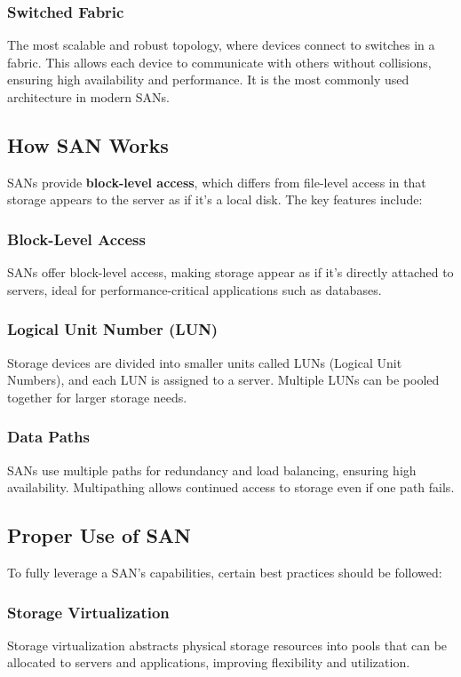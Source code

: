 \documentclass{article}
\begin{document}
\subsubsection{Switched Fabric}
The most scalable and robust topology, where devices connect to switches in a fabric. This allows each device to communicate with others without collisions, ensuring high availability and performance. It is the most commonly used architecture in modern SANs.

\subsection{How SAN Works}
SANs provide \textbf{block-level access}, which differs from file-level access in that storage appears to the server as if it's a local disk. The key features include:

\subsubsection{Block-Level Access}
SANs offer block-level access, making storage appear as if it's directly attached to servers, ideal for performance-critical applications such as databases.

\subsubsection{Logical Unit Number (LUN)}
Storage devices are divided into smaller units called LUNs (Logical Unit Numbers), and each LUN is assigned to a server. Multiple LUNs can be pooled together for larger storage needs.

\subsubsection{Data Paths}
SANs use multiple paths for redundancy and load balancing, ensuring high availability. Multipathing allows continued access to storage even if one path fails.

\subsection{Proper Use of SAN}
To fully leverage a SAN's capabilities, certain best practices should be followed:

\subsubsection{Storage Virtualization}
Storage virtualization abstracts physical storage resources into pools that can be allocated to servers and applications, improving flexibility and utilization.
\end{document}
